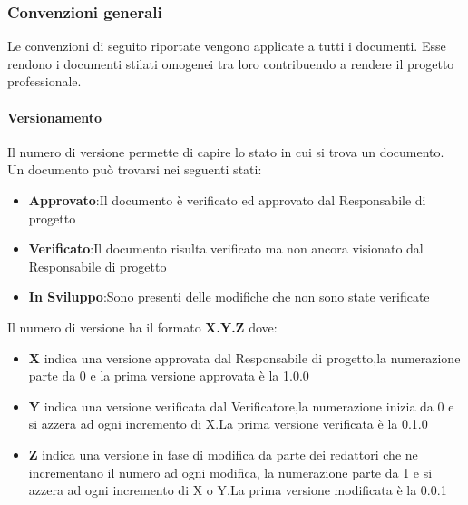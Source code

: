 \subsubsection{Convenzioni generali}
Le convenzioni di seguito riportate vengono applicate a tutti i documenti.
Esse rendono i documenti stilati omogenei tra loro contribuendo a rendere il progetto professionale.

\paragraph{Versionamento}
Il numero di versione permette di capire lo stato in cui si trova un documento.
Un documento può trovarsi nei seguenti stati:
\begin{itemize} 
    \item \textbf{Approvato}:Il documento è verificato ed approvato dal Responsabile di progetto
    \item \textbf{Verificato}:Il documento risulta verificato ma non ancora visionato dal Responsabile di progetto
    \item \textbf{In Sviluppo}:Sono presenti delle modifiche che non sono state verificate
\end{itemize}
Il numero di versione ha il formato \textbf{X.Y.Z} dove:
\begin{itemize} 
    \item \textbf{X} indica una versione approvata dal Responsabile di progetto,la numerazione parte da 0
    e la prima versione approvata è la 1.0.0
    \item \textbf{Y} indica una versione verificata dal Verificatore,la numerazione inizia da 0 e si azzera ad ogni incremento di X.La prima versione
    verificata è la 0.1.0
    \item \textbf{Z} indica una versione in fase di modifica da parte dei redattori che ne incrementano il numero ad ogni modifica,
    la numerazione parte da 1 e si azzera ad ogni incremento di X o Y.La prima versione modificata è la 0.0.1
\end{itemize}

